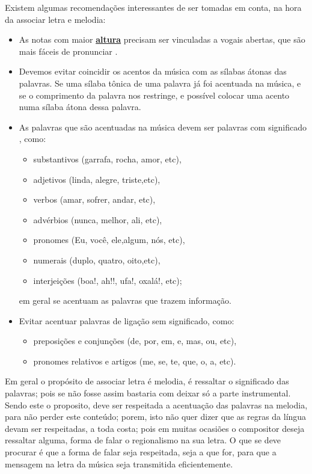 Existem algumas recomendações interessantes de ser tomadas em conta, na hora da associar letra e melodia:
\begin{itemize}
\item As notas com maior \hyperref[sec:pos:Altura]{\textbf{altura}} precisam ser vinculadas a vogais abertas,
 que são mais fáceis de pronunciar \cite[pp. 61]{howard1991aprendendo}.
\item Devemos evitar coincidir os acentos da música com as sílabas átonas das palavras.
Se uma sílaba tônica de uma palavra já foi acentuada na música, 
e se o comprimento da palavra nos restringe,
e possível colocar uma acento numa sílaba átona dessa palavra. 
\item As palavras que são acentuadas na música devem ser palavras com significado \cite[pp. 61]{howard1991aprendendo},
como:
\begin{itemize}
\item substantivos (garrafa, rocha, amor, etc), 
\item adjetivos (linda, alegre, triste,etc), 
\item verbos (amar, sofrer, andar, etc), 
\item advérbios (nunca, melhor, ali, etc), 
\item pronomes (Eu, você, ele,algum,  nós, etc), 
\item numerais (duplo, quatro, oito,etc), 
\item interjeições (boa!, ah!!, ufa!, oxalá!, etc); 
\end{itemize}
em geral se acentuam as palavras que trazem informação.
\item Evitar acentuar palavras de ligação sem significado, como: 
\begin{itemize}
\item preposições e conjunções (de, por, em, e, mas, ou, etc),
\item pronomes relativos e artigos (me, se, te, que, o, a, etc).
\end{itemize}
\end{itemize}



Em geral o propósito de associar letra é melodia, 
é ressaltar o significado das palavras;
pois se não fosse assim bastaria com deixar só a parte instrumental.
Sendo este o proposito, deve ser respeitada a acentuação das palavras na melodia,
para não perder este conteúdo;
porem, isto não quer dizer que as regras da língua devam ser respeitadas,
a toda costa; pois em muitas ocasiões o compositor deseja ressaltar alguma,
forma de falar o regionalismo na sua letra. 
O que se deve procurar é que a forma de falar seja respeitada,
seja a que for, para que a mensagem na letra da música seja transmitida eficientemente.



